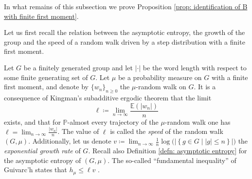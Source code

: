 \documentclass[reqno,oneside,11pt]{amsart}
\renewcommand{\P}{\mathbb{P}}
\newcommand{\E}{\mathbb{E}}
\theoremstyle{plain}
\theoremstyle{definition}
\begin{document}

In what remains of this subsection we prove Proposition \ref{prop: identification of B with finite first moment}.

Let us first recall the relation between the asymptotic entropy, the growth of the group and the speed of a random walk driven by a step distribution with a finite first moment.

Let $G$ be a finitely generated group and let $|\cdot |$ be the word length with respect to some finite generating set of $G$. Let $\mu$ be a probability measure on $G$ with a finite first moment, and denote by $\{w_n\}_{n\ge 0}$ the $\mu$-random walk on $G$. It is a consequence of Kingman's subadditive ergodic theorem that the limit
\begin{equation} \label{eq: speed rw}
	\ell\coloneqq\lim_{n\to \infty}\frac{\E(|w_n|)}{n}
\end{equation}
exists, and that for $\P$-almost every trajectory of the $\mu$-random walk one has $\ell=\lim_{n\to \infty}\frac{|w_n|}{n}$. The value of $\ell$ is called the \emph{speed} of the random walk $(G,\mu)$. Additionally, let us denote $v\coloneqq\lim_{n\to \infty} \frac{1}{n}\log\Big(\left| \left\{ g\in G\mid |g|\le n \right\}\right|\Big)$ the \emph{exponential growth rate} of $G$. Recall also Definition \ref{defn: asymptotic entropy} for the asymptotic entropy of $(G,\mu)$.  The so-called ``fundamental inequality'' of Guivarc'h states that $h_{\mu}\le \ell v$ \cite[Proposition 2]{Guivarch1980}. 
\end{document}
